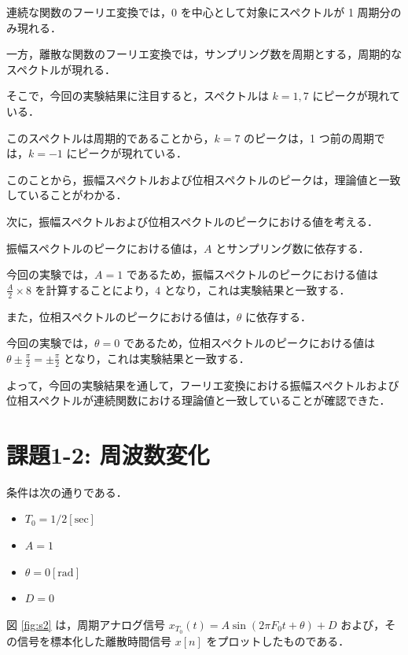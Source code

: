 \documentclass[fleqn, a4paper. 12pt]{jsarticle}
\begin{document}
      連続な関数のフーリエ変換では，$0$ を中心として対象にスペクトルが 1 周期分のみ現れる．

      一方，離散な関数のフーリエ変換では，サンプリング数を周期とする，周期的なスペクトルが現れる．

      そこで，今回の実験結果に注目すると，スペクトルは $k = 1, 7$ にピークが現れている．
      
      このスペクトルは周期的であることから，$k = 7$ のピークは，1 つ前の周期では，$k = -1$ にピークが現れている．

      このことから，振幅スペクトルおよび位相スペクトルのピークは，理論値と一致していることがわかる．

      \quad

      次に，振幅スペクトルおよび位相スペクトルのピークにおける値を考える．

      振幅スペクトルのピークにおける値は，$A$ とサンプリング数に依存する．

      今回の実験では，$A = 1$ であるため，振幅スペクトルのピークにおける値は $\frac{A}{2} \times 8$ を計算することにより，$4$ となり，これは実験結果と一致する．

      また，位相スペクトルのピークにおける値は，$\theta$ に依存する．

      今回の実験では，$\theta = 0$ であるため，位相スペクトルのピークにおける値は $\theta \pm \frac{\pi}{2} = \pm \frac{\pi}{2}$ となり，これは実験結果と一致する．

      よって，今回の実験結果を通して，フーリエ変換における振幅スペクトルおよび位相スペクトルが連続関数における理論値と一致していることが確認できた．
  
  \newpage
  \section*{課題1-2: 周波数変化}

  条件は次の通りである．

  \begin{itemize}
    \item $T_0 = 1/2 [\mathrm{sec}]$
    \item $A = 1$
    \item $\theta = 0 [\mathrm{rad}]$
    \item $D = 0$
  \end{itemize}

  図 \ref{fig:s2} は，周期アナログ信号 $x_{T_0}(t)=A \sin \left(2 \pi F_0 t+\theta\right)+D$ および，その信号を標本化した離散時間信号 $x[n]$ をプロットしたものである．
\end{document}
